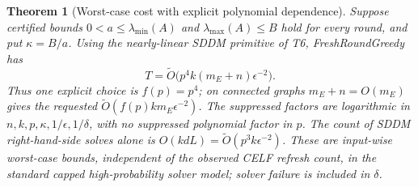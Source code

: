 \documentclass[11pt]{article}
\newtheorem{theorem}{Theorem}
\begin{document}
\begin{theorem}[Worst-case cost with explicit polynomial dependence]
\label{thm:freshcost}
Suppose certified bounds $0<a\leq\lambda_{\min}(A)$ and
$\lambda_{\max}(A)\leq B$ hold for every round, and put $\kappa=B/a$.
Using the nearly-linear SDDM primitive of T6, FreshRoundGreedy has
\begin{equation}\label{eq:freshcost}
 T=\widetilde O\bigl(p^4 k(m_E+n)\epsilon^{-2}\bigr).
\end{equation}
Thus one explicit choice is $f(p)=p^4$; on connected graphs
$m_E+n=O(m_E)$ gives the requested
$\widetilde O(f(p)km_E\epsilon^{-2})$.
The suppressed factors are logarithmic in
$n,k,p,\kappa,1/\epsilon,1/\delta$, with no suppressed polynomial
factor in $p$. The count of SDDM right-hand-side solves alone is
$O(kdL)=\widetilde O(p^3k\epsilon^{-2})$.
These are input-wise worst-case bounds, independent of the observed
CELF refresh count, in the standard capped high-probability solver
model; solver failure is included in $\delta$.
\end{theorem}
\end{document}
